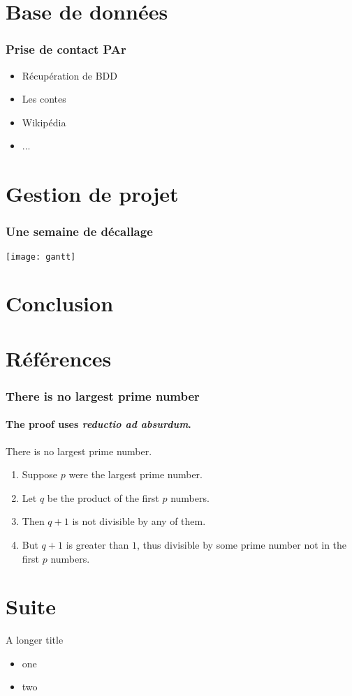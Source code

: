 \documentclass{beamer}
\begin{document}
\section{Base de données}

\begin{frame}
	\frametitle{Prise de contact PAr}
	\begin{itemize}
		\item Récupération de BDD
		\item Les contes
		\item Wikipédia
		\item ...
	\end{itemize}
\end{frame}


\section{Gestion de projet}

\begin{frame}
	\frametitle{Une semaine de décallage}
	\texttt{[image: gantt]}
\end{frame}

\section{Conclusion}

\section{Références}

\begin{frame} 
	\frametitle{There is no largest prime number} 
	\framesubtitle{The proof uses \textit{reductio ad absurdum}.} 
	
	\begin{theorem}
		There is no largest prime number. 
	\end{theorem} 
	
	\begin{enumerate} 
		\item<1-| alert@1> Suppose $p$ were the largest prime number. 
		\item<2-> Let $q$ be the product of the first $p$ numbers. 
		\item<3-> Then $q+1$ is not divisible by any of them. 
		\item<1-> But $q + 1$ is greater than $1$, thus divisible by some prime
			number not in the first $p$ numbers.
	\end{enumerate}
\end{frame}

\section{Suite}
\begin{frame}{A longer title}
	\begin{itemize}
		\item one
		\item two
	\end{itemize}
\end{frame}
\end{document}

